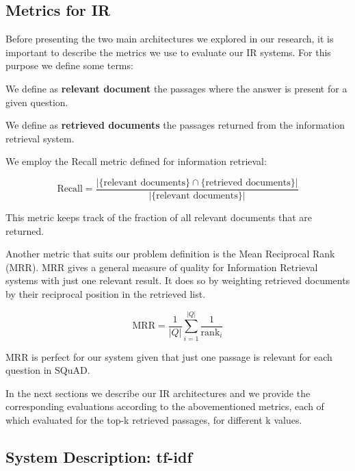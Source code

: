 \documentclass{article}
\begin{document}
\subsection{Metrics for IR}\label{metrics_IR}
Before presenting the two main architectures we explored in our research, it is important to describe the metrics we use to evaluate our IR systems. For this purpose we define some terms:

We define as \textbf{relevant document} the passages where the answer is present for a given question. 

We define as \textbf{retrieved documents} the passages returned from the information retrieval system.

We employ the Recall metric defined for information retrieval:

\begin{equation}\label{recall_eq}
\text{Recall}=\frac{|\{\text{relevant documents}\}\cap\{\text{retrieved documents}\}|}{|\{\text{relevant documents}\}|}
\end{equation}

This metric keeps track of the fraction of all relevant documents that are returned.

Another metric that suits our problem definition is the Mean Reciprocal Rank (MRR). MRR gives a general measure of quality for Information Retrieval systems with just one relevant result. It does so by weighting retrieved documents by their reciprocal position in the retrieved list.

\begin{equation}\label{mrr_eq}
{\text{MRR}}={\frac  {1}{|Q|}}\sum _{{i=1}}^{{|Q|}}{\frac  {1}{{\text{rank}}_{i}}}
\end{equation}

MRR is perfect for our system given that just one passage is relevant for each question in SQuAD.

In the next sections we describe our IR architectures and we provide the corresponding evaluations according to the abovementioned metrics, each of which evaluated for the top-k retrieved passages, for different k values.


\subsection{System Description: tf-idf}\label{tfidf section}
\end{document}
